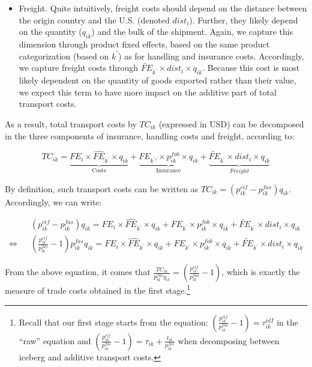 \documentclass[a4paper,11pt]{article}
\begin{document}
\begin{itemize}
\item Freight. Quite intuitively, freight costs should depend on the distance between the origin country and the U.S. (denoted $dist_i$). Further, they likely depend on the quantity ($q_{ik}$) and the bulk of the shipment. Again, we capture this dimension through product fixed effects, based on the same product categorization (based on $k^\prime$) as for handling and insurance costs. Accordingly, we capture freight costs through $\widetilde{FE}_{k^\prime}\times dist_i\times q_{ik}$. Because this cost is most likely dependent on the quantity of goods exported rather than their value, we expect this term to have more impact on the additive part of total transport costs.


\end{itemize}

As a result, total transport costs by $TC_{ik}$ (expressed in USD) can be decomposed in the three components of insurance, handling costs and freight, according to:

$$TC_{ik} =  \underbrace{FE_i\times\widehat{FE}_{k^\prime}\times q_{ik}}_{\text{Costs}} +\underbrace{FE_{k^\prime \prime}\times p_{ik}^{fob}\times q_{ik}}_{\text{Insurance}}+ \underbrace{\widetilde{FE}_{k^\prime}\times dist_i\times q_{ik}}_{Freight}$$

By definition, such transport costs can be written as $TC_{ik} = (p^{cif}_{ik} - p^{fas}_{ik})q_{ik}$. Accordingly, we can write:

\begin{eqnarray*}
&&(p^{cif}_{ik} - p^{fas}_{ik})q_{ik} = FE_i\times\widehat{FE}_{k^\prime}\times q_{ik}+ FE_{k^\prime}\times p_{ik}^{fob}\times q_{ik}+ \widetilde{FE}_{k^\prime}\times dist_i\times q_{ik} \\
\Leftrightarrow && \left(\frac{p^{cif}_{ik}}{p^{fas}_{ik}} -1 \right)p^{fas}_{ik} q_{ik} = FE_i\times\widehat{FE}_{k^\prime}\times q_{ik}+ FE_{k^\prime}\times p_{ik}^{fob}\times q_{ik}+ \widetilde{FE}_{k^\prime}\times dist_i\times q_{ik}
\end{eqnarray*}

From the above equation, it comes that $\frac{TC_{ik}}{p^{fas}_{ik} q_{ik}} = \left(\frac{p^{cif}_{ik}}{p^{fas}_{ik}} -1 \right)$, which is exactly the measure of trade costs obtained in the first stage.\footnote{Recall that our first stage starts from the equation: $\left(\frac{p^{cif}_{ik}}{p^{fas}_{ik}} -1 \right) = \tau^{nlI}_{ik}$ in the ``raw'' equation and $\left(\frac{p^{cif}_{ik}}{p^{fas}_{ik}} -1 \right) = \tau_{ik}+ \frac{t_{ik}}{p^{fas}_{ik}}$ when decomposing between iceberg and additive transport costs.}
\end{document}
